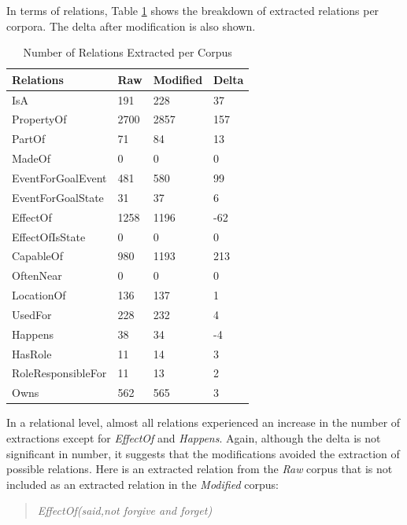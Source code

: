 In terms of relations, Table \ref{tab:reltotal} shows the breakdown of extracted relations per corpora. The delta after modification is also shown. 

\begin{table}[H]   %
\centering
\caption{Number of Relations Extracted per Corpus} \vspace{0.25em}
\begin{tabular}{|p{4.5cm}|p{2cm}|p{2cm}|p{2cm}|} \hline
\textbf{Relations} & \textbf{Raw} & \textbf{Modified} & \textbf{Delta} \\ \hline
IsA & 191 & 228 & 37 \\ \hline
PropertyOf & 2700 & 2857 & 157 \\ \hline
PartOf  & 71 & 84 & 13 \\ \hline
MadeOf & 0 & 0 & 0 \\ \hline
EventForGoalEvent & 481 & 580 & 99 \\ \hline
EventForGoalState & 31 & 37 & 6 \\ \hline
EffectOf & 1258 & 1196 & -62 \\ \hline
EffectOfIsState & 0 & 0 & 0 \\ \hline
CapableOf & 980 & 1193 & 213 \\ \hline
OftenNear & 0 & 0 & 0 \\ \hline
LocationOf & 136 & 137 & 1 \\ \hline
UsedFor & 228 & 232 & 4 \\ \hline
Happens & 38 & 34 & -4 \\ \hline
HasRole & 11 & 14 & 3 \\ \hline
RoleResponsibleFor & 11 & 13 & 2 \\ \hline
Owns & 562 & 565 & 3 \\ \hline
\end{tabular}
\label{tab:reltotal}
\end{table}

In a relational level, almost all relations experienced an increase in the number of extractions except for \textit{EffectOf} and \textit{Happens}. Again, although the delta is not significant in number, it suggests that the modifications avoided the extraction of possible relations. Here is an  extracted relation from the \textit{Raw} corpus that is not included as an extracted relation in the \textit{Modified} corpus:

\begin{verse}
\itshape
EffectOf(said,not forgive and forget)
\end{verse}

